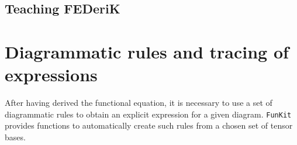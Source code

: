 \documentclass[10pt,prd,nofootinbib,superscriptaddress,twocolumn]{revtex4-2}
\newcommand{\FunKit}{\texttt{FunKit}\xspace}
\begin{document}
\subsection{Teaching FEDeriK}
\label{sec:FEDeriK_teaching}


\section{Diagrammatic rules and tracing of expressions}
\label{sec:AnSEL}

After having derived the functional equation, it is necessary to use a set of diagrammatic rules to obtain an explicit expression for a given diagram. \FunKit provides functions to automatically create such rules from a chosen set of tensor bases.
\end{document}
